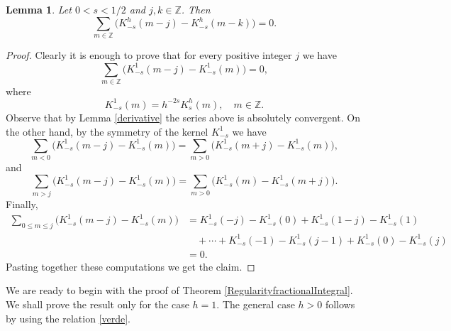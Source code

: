 \documentclass[a4paper,11pt,reqno]{amsart}
\newcommand{\Z}{\mathbb{Z}}
\newtheorem{lem}[thm]{Lemma}
\theoremstyle{definition}
\numberwithin{equation}{section}
\begin{document}
\begin{lem}
\label{cero}
Let $0<s<1/2$ and $j,k\in \Z$. Then
$$
\sum_{m\in\Z}\big(K^h_{-s}(m-j)-K^h_{-s}(m-k)\big)=0.
$$
\end{lem}

\begin{proof}
Clearly it is enough to prove that for every positive integer $j$ we have
$$
\sum_{m\in\Z}\big(K^1_{-s}(m-j)-K^1_{-s}(m)\big)=0,
$$
where
\begin{equation}
\label{verde}
K_{-s}^1(m)=h^{-2s}K_s^h(m),\quad m\in\Z.
\end{equation}
Observe that by Lemma \ref{derivative} the series above is absolutely convergent.
On the other hand, by the symmetry of the kernel $K^1_{-s}$ we have
$$
\sum_{m<0}\big(K^1_{-s}(m-j)-K^1_{-s}(m)\big)=\sum_{m>0}\big(K^1_{-s}(m+j)-K^1_{-s}(m)\big),
$$
and
$$
\sum_{m>j}\big(K^1_{-s}(m-j)-K^1_{-s}(m)\big)=\sum_{m>0}\big(K^1_{-s}(m)-K^1_{-s}(m+j)\big).
$$
Finally,
\begin{align*}
\sum_{0\le m\le j}\big(K^1_{-s}(m-j)-K^1_{-s}(m)\big) &=K^1_{-s}(-j)-K^1_{-s}(0)+
K^1_{-s}(1-j)-K^1_{-s}(1) \\
&\quad+\cdots+K^1_{-s}(-1)-K^1_{-s}(j-1)+K^1_{-s}(0)-K^1_{-s}(j)\\
&=0.
\end{align*}
Pasting together these computations we get the claim.
\end{proof}

We are ready to begin with the proof of Theorem \ref{RegularityfractionalIntegral}.
We shall prove the result only for the case $h=1$.
The general case $h>0$ follows by using the relation \eqref{verde}.
\end{document}
